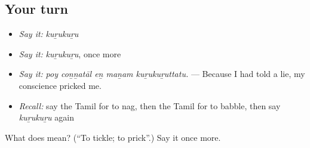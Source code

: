 \subsection*{Your turn}
\begin{itemize}
\raggedright
  \item \emph{Say it:} \emph{kuṟukuṟu}
  \item \emph{Say it:} \emph{kuṟukuṟu}, once more
  \item \emph{Say it:} \emph{poy coṉṉatāl eṉ maṉam kuṟukuṟuttatu.} — Because I had told a lie, my conscience pricked me.
  \item \emph{Recall:} say the Tamil for to nag, then the Tamil for to babble, then say \emph{kuṟukuṟu} again
\end{itemize}

\begin{tcolorbox}[breakable,colback=teal!4,colframe=teal!35!black,title={Before you move on}]
What does  mean? (\textquotedblleft{}To tickle; to prick\textquotedblright{}.) Say it once more.
\end{tcolorbox}
